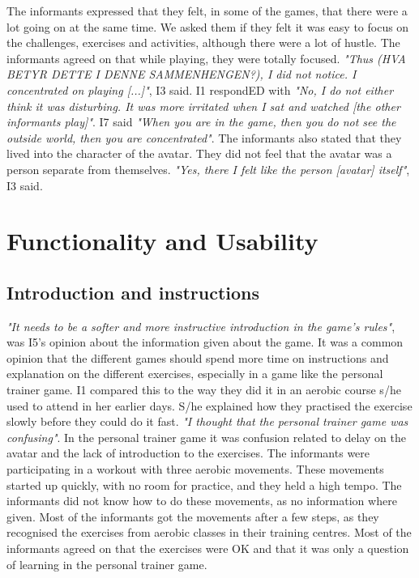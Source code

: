 The informants expressed that they felt, in some of the games, that there were a lot going on at the same time. We asked them if they felt it was easy to focus on the challenges, exercises and activities, although there were a lot of hustle. The informants agreed on that while playing, they were totally focused. \emph{"Thus (HVA BETYR DETTE I DENNE SAMMENHENGEN?), I did not notice. I concentrated on playing [...]"}, I3 said. I1 respondED with \emph{"No, I do not either think it was disturbing. It was more irritated when I sat and watched [the other informants play]"}. I7 said \emph{"When you are in the game, then you do not see the outside world, then you are concentrated"}. The informants also stated that they lived into the character of the avatar. They did not feel that the avatar was a person separate from themselves. \emph{"Yes, there I felt like the person [avatar] itself"}, I3 said. 

\section{Functionality and Usability}
\subsection{Introduction and instructions}
\emph{"It needs to be a softer and more instructive introduction in the game's rules"}, was I5's opinion about the information given about the game. It was a common opinion that the different games should spend more time on instructions and explanation on the different exercises, especially in a game like the personal trainer game. I1 compared this to the way they did it in an aerobic course s/he used to attend in her earlier days. S/he explained how they practised the exercise slowly before they could do it fast. \emph{"I thought that the personal trainer game was confusing"}. In the personal trainer game it was confusion related to delay on the avatar and the lack of introduction to the exercises. The informants were participating in a workout with three aerobic movements. These movements started up quickly, with no room for practice, and they held a high tempo. The informants did not know how to do these movements, as no information where given. Most of the informants got the movements after a few steps, as they recognised the exercises from aerobic classes in their training centres. Most of the informants agreed on that the exercises were OK and that it was only a question of learning in the personal trainer game. 

